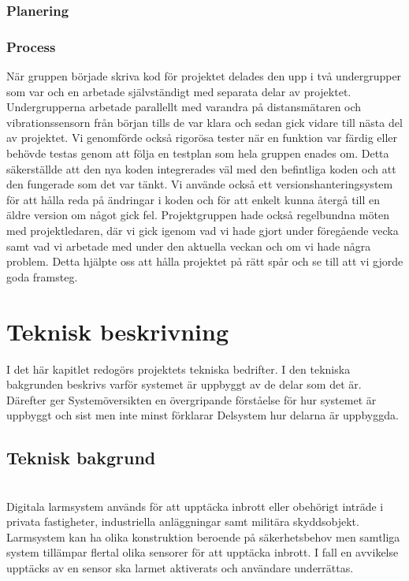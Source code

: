 \documentclass{article}
\begin{document}
\subsubsection{Planering}

\subsubsection{Process}
När gruppen började skriva kod för projektet delades den upp i två undergrupper som var och en arbetade självständigt med separata delar av projektet. 
Undergrupperna arbetade parallellt med varandra på distansmätaren och vibrationssensorn från början tills de var klara och sedan gick vidare till nästa del av projektet.
Vi genomförde också rigorösa tester när en funktion var färdig eller behövde testas genom att följa en testplan som hela gruppen enades om. 
Detta säkerställde att den nya koden integrerades väl med den befintliga koden och att den fungerade som det var tänkt.
Vi använde också ett versionshanteringsystem för att hålla reda på ändringar i koden och för att enkelt kunna återgå till en äldre version om något gick fel.
Projektgruppen hade också regelbundna möten med projektledaren,
där vi gick igenom vad vi hade gjort under föregående vecka samt vad vi arbetade med under den aktuella veckan och om vi hade några problem.
Detta hjälpte oss att hålla projektet på rätt spår och se till att vi gjorde goda framsteg.

\newpage
\section{Teknisk beskrivning}
I det här kapitlet redogörs projektets tekniska bedrifter. 
I den tekniska bakgrunden beskrivs varför systemet är uppbyggt av de delar som det är.
Därefter ger Systemöversikten en övergripande förståelse för hur systemet är uppbyggt och sist men inte minst förklarar Delsystem hur delarna är uppbyggda.


\subsection{Teknisk bakgrund}\\
Digitala larmsystem används för att upptäcka inbrott eller obehörigt inträde i privata fastigheter, industriella anläggningar samt militära skyddsobjekt. Larmsystem kan ha olika konstruktion beroende på säkerhetsbehov men samtliga system tillämpar flertal olika sensorer för att upptäcka inbrott. I fall en avvikelse upptäcks av en sensor ska larmet aktiverats och användare underrättas.
\end{document}
